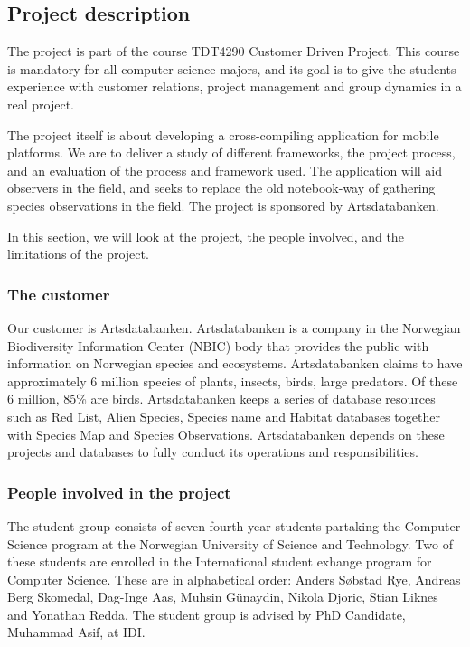 \subsection{Project description}
The project is part of the course TDT4290 Customer Driven Project. This course
is mandatory for all computer science majors, and its goal is to give the
students experience with customer relations, project management and group
dynamics in a real project.

The project itself is about developing a cross-compiling application for mobile
platforms. We are to deliver a study of different frameworks, the project
process, and an evaluation of the process and framework used. The application
will aid observers in the field, and seeks to replace the old notebook-way of
gathering species observations in the field. The project is sponsored by
Artsdatabanken.

In this section, we will look at the project, the people involved, and the
limitations of the project.

\subsubsection{The customer}
Our customer is Artsdatabanken. Artsdatabanken is a company in the
Norwegian Biodiversity Information Center (NBIC) body that provides the
public with information on Norwegian species and ecosystems.
Artsdatabanken claims to have approximately 6 million species of plants,
insects, birds, large predators. Of these 6 million, 85\% are birds.
Artsdatabanken keeps a series of database resources such as Red List,
Alien Species, Species name and Habitat databases together with Species
Map and Species Observations. Artsdatabanken depends on these projects
and databases to fully conduct its operations and
responsibilities.\cite{artsdatabanken:about}

\subsubsection{People involved in the project}
The student group consists of seven fourth year students partaking the Computer
Science program at the Norwegian University of Science and Technology. Two of
these students are enrolled in the International student exhange program for
Computer Science. These are in alphabetical order: Anders Søbstad Rye, Andreas
Berg Skomedal, Dag-Inge Aas, Muhsin Günaydin, Nikola Djoric, Stian Liknes and
Yonathan Redda. The student group is advised by PhD Candidate, Muhammad Asif, at
IDI.

